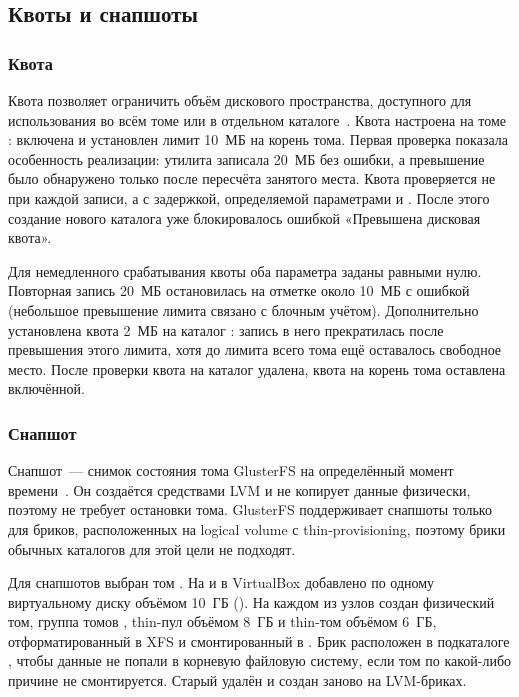 \subsection{Квоты и снапшоты}

\subsubsection{Квота}

Квота позволяет ограничить объём дискового пространства, доступного для использования во всём томе или в отдельном каталоге~\cite{gluster-quota}. Квота настроена на томе : включена и установлен лимит 10~МБ на корень тома.
Первая проверка показала особенность реализации: утилита  записала 20~МБ без ошибки, а превышение было обнаружено только после пересчёта занятого места. Квота проверяется не при каждой записи, а с задержкой, определяемой параметрами  и . После этого создание нового каталога уже блокировалось ошибкой «Превышена дисковая квота».


Для немедленного срабатывания квоты оба параметра заданы равными нулю. Повторная запись 20~МБ остановилась на отметке около 10~МБ с ошибкой  (небольшое превышение лимита связано с блочным учётом). Дополнительно установлена квота 2~МБ на каталог : запись в него прекратилась после превышения этого лимита, хотя до лимита всего тома ещё оставалось свободное место. После проверки квота на каталог удалена, квота на корень тома оставлена включённой.


\subsubsection{Снапшот}

Снапшот~--- снимок состояния тома GlusterFS на определённый момент времени~\cite{gluster-snapshots}. Он создаётся средствами LVM и не копирует данные физически, поэтому не требует остановки тома. GlusterFS поддерживает снапшоты только для бриков, расположенных на logical volume с thin-provisioning, поэтому брики обычных каталогов для этой цели не подходят.

Для снапшотов выбран том . На  и  в VirtualBox добавлено по одному виртуальному диску объёмом 10~ГБ (). На каждом из узлов создан физический том, группа томов , thin-пул  объёмом 8~ГБ и thin-том  объёмом 6~ГБ, отформатированный в XFS и смонтированный в . Брик расположен в подкаталоге , чтобы данные не попали в корневую файловую систему, если том по какой-либо причине не смонтируется. Старый  удалён и создан заново на LVM-бриках.


